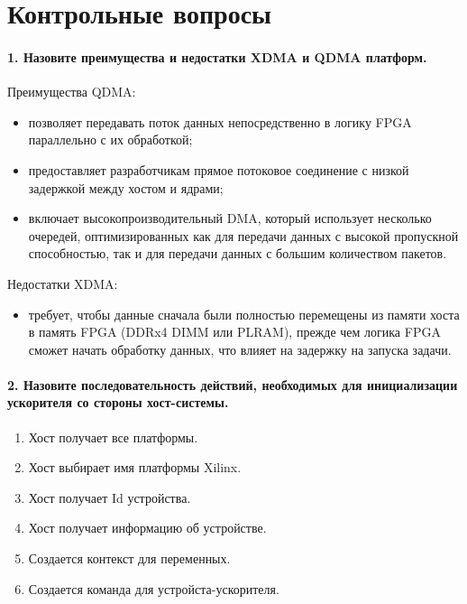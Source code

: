\chapter*{Контрольные вопросы}

\subsubsection{\textbf{1. Назовите преимущества и недостатки XDMA и QDMA платформ.}}
Преимущества QDMA:
\begin{itemize}
	\item позволяет передавать поток данных непосредственно в логику FPGA параллельно с их обработкой;
	\item предоставляет разработчикам прямое потоковое соединение с низкой задержкой между хостом и ядрами;
	\item включает высокопроизводительный DMA, который использует несколько очередей, оптимизированных как для передачи данных с высокой пропускной способностью, так и для передачи данных с большим количеством пакетов.
\end{itemize}

Недостатки XDMA:
\begin{itemize}
	\item требует, чтобы данные сначала были полностью перемещены из памяти хоста в память FPGA (DDRx4 DIMM или PLRAM), прежде чем логика FPGA сможет начать обработку данных, что влияет на задержку на запуска задачи.
\end{itemize}

\subsubsection{\textbf{2. Назовите последовательность действий, необходимых для инициализации ускорителя со стороны хост-системы.}}
\begin{enumerate}
	\item Хост получает все платформы.
	\item Хост выбирает имя платформы Xilinx.
	\item Хост получает Id устройства.
	\item Хост получает информацию об устройстве.
	\item Создается контекст для переменных.
	\item Создается команда для устройста-ускорителя.
\end{enumerate}

